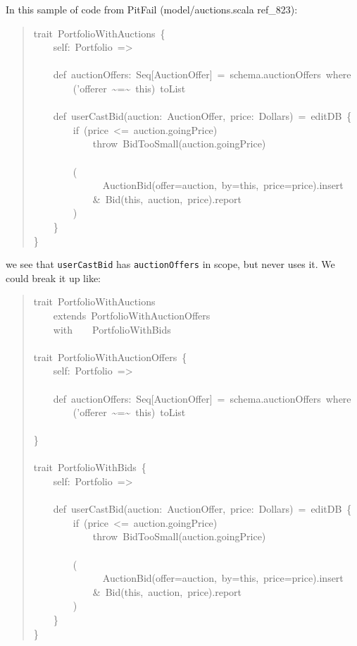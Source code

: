 \documentclass[a4]{article}
\begin{document}
In this sample of code from PitFail (model/auctions.scala ref\_823):
%
\begin{quote}{\ttfamily \raggedright \noindent
trait~PortfolioWithAuctions~\{\\
~~~~self:~Portfolio~=>\\
~\\
~~~~def~auctionOffers:~Seq{[}AuctionOffer{]}~=~schema.auctionOffers~where\\
~~~~~~~~('offerer~\textasciitilde{}=\textasciitilde{}~this)~toList\\
~\\
~~~~def~userCastBid(auction:~AuctionOffer,~price:~Dollars)~=~editDB~\{\\
~~~~~~~~if~(price~<=~auction.goingPrice)\\
~~~~~~~~~~~~throw~BidTooSmall(auction.goingPrice)\\
~\\
~~~~~~~~(\\
~~~~~~~~~~~~~~AuctionBid(offer=auction,~by=this,~price=price).insert\\
~~~~~~~~~~~~\&~Bid(this,~auction,~price).report\\
~~~~~~~~)\\
~~~~\}\\
\}
}
\end{quote}

we see that \texttt{userCastBid} has \texttt{auctionOffers} in scope, but never uses it.
We could break it up like:
%
\begin{quote}{\ttfamily \raggedright \noindent
trait~PortfolioWithAuctions\\
~~~~extends~PortfolioWithAuctionOffers\\
~~~~with~~~~PortfolioWithBids\\
~\\
trait~PortfolioWithAuctionOffers~\{\\
~~~~self:~Portfolio~=>\\
~\\
~~~~def~auctionOffers:~Seq{[}AuctionOffer{]}~=~schema.auctionOffers~where\\
~~~~~~~~('offerer~\textasciitilde{}=\textasciitilde{}~this)~toList\\
~\\
\}\\
~\\
trait~PortfolioWithBids~\{\\
~~~~self:~Portfolio~=>\\
~\\
~~~~def~userCastBid(auction:~AuctionOffer,~price:~Dollars)~=~editDB~\{\\
~~~~~~~~if~(price~<=~auction.goingPrice)\\
~~~~~~~~~~~~throw~BidTooSmall(auction.goingPrice)\\
~\\
~~~~~~~~(\\
~~~~~~~~~~~~~~AuctionBid(offer=auction,~by=this,~price=price).insert\\
~~~~~~~~~~~~\&~Bid(this,~auction,~price).report\\
~~~~~~~~)\\
~~~~\}\\
\}
}
\end{quote}
\end{document}
